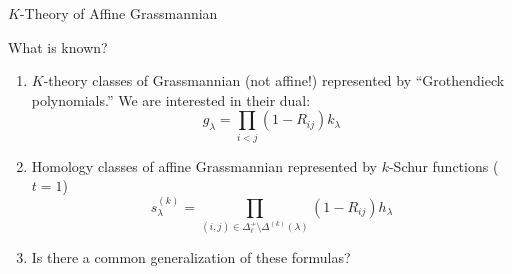 \documentclass{beamer}
\begin{document}
\begin{frame}{\(K\)-Theory of Affine Grassmannian}
  \begin{block}{What is known?}
    \begin{enumerate}
    \item \(K\)-theory classes of Grassmannian (not affine!)
      represented by
      ``Grothendieck 
      polynomials.'' We are interested in their dual: \[
        g_\lambda = \prod_{i < j} (1-R_{ij}) k_\lambda
      \]
    \item Homology classes of affine Grassmannian represented by
      \(k\)-Schur functions (\(t=1\)) \[
        s_\lambda^{(k)} = \prod_{(i,j) \in \Delta^+_\ell \setminus
          \Delta^{(k)}(\lambda)} (1-R_{ij}) h_\lambda
        \] %
        \vspace{-0.2in}
     \item Is there a common generalization of these formulas?
    \end{enumerate}
  \end{block}
\end{frame}
\end{document}
